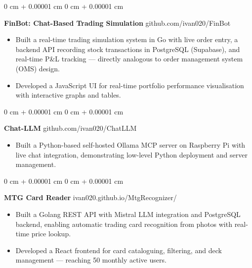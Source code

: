 \documentclass[6pt, letterpaper]{article}
\newenvironment{highlights}{
    \begin{itemize}[
        topsep=0.03 cm,
        parsep=0.03 cm,
        partopsep=0pt,
        itemsep=0pt,
        leftmargin=0 cm + 10pt
    ]
}{
    \end{itemize}
} %
\newenvironment{onecolentry}{
    \begin{adjustwidth}{
        0 cm + 0.00001 cm
    }{
        0 cm + 0.00001 cm
    }
}{
    \end{adjustwidth}
} %
\begin{document}
    \begin{onecolentry}
        \textbf{FinBot: Chat-Based Trading Simulation} \hfill github.com/ivan020/FinBot

        \begin{highlights}
            \item Built a real-time trading simulation system in Go with live order entry, a backend API recording stock transactions in PostgreSQL (Supabase), and real-time P\&L tracking — directly analogous to order management system (OMS) design.
            \item  Developed a JavaScript UI for real-time portfolio performance visualisation with interactive graphs and tables.       
        \end{highlights}
    \end{onecolentry}

    \begin{onecolentry}
        \textbf{Chat-LLM} \hfill github.com/ivan020/ChatLLM

        \begin{highlights}
            \item Built a Python-based self-hosted Ollama MCP server on Raspberry Pi with live chat integration, demonstrating low-level Python deployment and server management.
        \end{highlights}
    \end{onecolentry}


    \begin{onecolentry}
        \textbf{MTG Card Reader} \hfill ivan020.github.io/MtgRecognizer/

        \begin{highlights}
        \item Built a Golang REST API with Mistral LLM integration and PostgreSQL backend, enabling automatic trading card recognition from photos with real-time price lookup.
        \item Developed a React frontend for card cataloguing, filtering, and deck management — reaching 50 monthly active users.        \end{highlights}
    \end{onecolentry}
\end{document}
